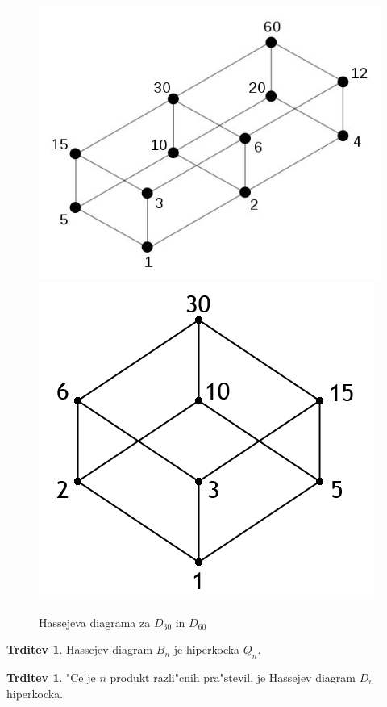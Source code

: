 \documentclass[a4paper,12pt]{article}
\theoremstyle{definition}
\newtheorem{claim}[counter]{Trditev}
\theoremstyle{remark}
\begin{document}
\begin{figure}[h!]
	\includegraphics[scale=0.4]{hasse_d60}
	\includegraphics[scale=0.6]{hasse_d30}
	\caption{Hassejeva diagrama za $D_{30}$ in $D_{60}$}
\end{figure}
\begin{claim}
	Hassejev diagram $B_n$ je hiperkocka $Q_n$.
\end{claim}
\begin{claim}\label{Dn_je_hiperkocka}
	"Ce je $n$ produkt razli"cnih pra"stevil, je Hassejev diagram $D_n$ hiperkocka.
\end{claim}
\end{document}
